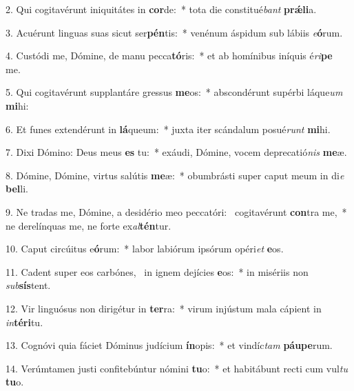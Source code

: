 2. Qui cogitavérunt iniquitátes in \textbf{cor}de:~*  tota die constitué\textit{bant} \textbf{prǽ}\textbf{li}a.\

3. Acuérunt linguas suas sicut ser\textbf{pén}tis:~*  venénum áspidum sub lábiis \textit{e}\textbf{ó}rum.\

4. Custódi me, Dómine, de manu pecca\textbf{tó}ris:~*  et ab homínibus iníquis é\textit{ri}\textbf{pe} me.\

5. Qui cogitavérunt supplantáre gressus \textbf{me}os:~*  abscondérunt supérbi láque\textit{um} \textbf{mi}hi:\

6. Et funes extendérunt in \textbf{lá}queum:~*  juxta iter scándalum posué\textit{runt} \textbf{mi}hi.\

7. Dixi Dómino: Deus meus \textbf{es} tu:~*  exáudi, Dómine, vocem deprecatió\textit{nis} \textbf{me}æ.\

8. Dómine, Dómine, virtus salútis \textbf{me}æ:~*  obumbrásti super caput meum in di\textit{e} \textbf{bel}li.\

9. Ne tradas me, Dómine, a desidério meo peccatóri: \dag\  cogitavérunt \textbf{con}tra me,~*  ne derelínquas me, ne forte ex\textit{al}\textbf{tén}tur.\

10. Caput circúitus e\textbf{ó}rum:~*  labor labiórum ipsórum opéri\textit{et} \textbf{e}os.\

11. Cadent super eos carbónes, \dag\  in ignem dejícies \textbf{e}os:~*  in misériis non \textit{sub}\textbf{sís}tent.\

12. Vir linguósus non dirigétur in \textbf{ter}ra:~*  virum injústum mala cápient in \textit{in}\textbf{tér}\textbf{i}tu.\

13. Cognóvi quia fáciet Dóminus judícium \textbf{ín}opis:~*  et vindíc\textit{tam} \textbf{páu}\textbf{pe}rum.\

14. Verúmtamen justi confitebúntur nómini \textbf{tu}o:~*  et habitábunt recti cum vul\textit{tu} \textbf{tu}o.\

